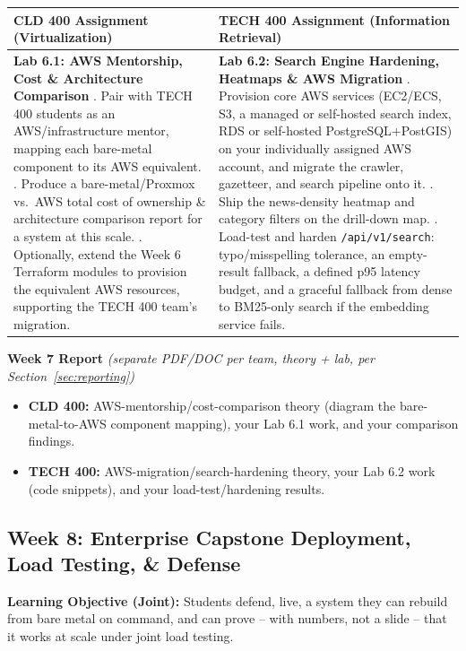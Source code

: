 \documentclass[10pt, a4paper]{article}
\newcommand{\weeklyreport}[3]{%
  \par\vspace{0.4em}
  \noindent\colorbox{lightgray!35}{\parbox{\dimexpr\textwidth-2\fboxsep\relax}{%
    \textbf{\color{primary}#1 Report} \textit{(separate PDF/DOC per team, theory + lab, per Section~\ref{sec:reporting})}
    \begin{itemize}
        \item \textbf{CLD 400:} #2
        \item \textbf{TECH 400:} #3
    \end{itemize}
  }}%
  \par\vspace{0.3em}
}
\begin{document}
\begin{table}[H]
\centering
\small
\renewcommand{\arraystretch}{1.2}
\begin{tabularx}{\textwidth}{|X|X|}
\hline
\rowcolor{lightgray}
\textbf{CLD 400 Assignment (Virtualization)} & \textbf{TECH 400 Assignment (Information Retrieval)} \\ \hline
\textbf{Lab 6.1: AWS Mentorship, Cost \& Architecture Comparison} \newline
1. Pair with TECH 400 students as an AWS/infrastructure mentor, mapping each bare-metal component to its AWS equivalent. \newline
2. Produce a bare-metal/Proxmox vs.\ AWS total cost of ownership \& architecture comparison report for a system at this scale. \newline
3. Optionally, extend the Week 6 Terraform modules to provision the equivalent AWS resources, supporting the TECH 400 team's migration. & \textbf{Lab 6.2: Search Engine Hardening, Heatmaps \& AWS Migration} \newline
1. Provision core AWS services (EC2/ECS, S3, a managed or self-hosted search index, RDS or self-hosted PostgreSQL+PostGIS) on your individually assigned AWS account, and migrate the crawler, gazetteer, and search pipeline onto it. \newline
2. Ship the news-density heatmap and category filters on the drill-down map. \newline
3. Load-test and harden \texttt{/api/v1/search}: typo/misspelling tolerance, an empty-result fallback, a defined p95 latency budget, and a graceful fallback from dense to BM25-only search if the embedding service fails. \\ \hline
\end{tabularx}
\end{table}

\weeklyreport{Week 7}{AWS-mentorship/cost-comparison theory (diagram the bare-metal-to-AWS component mapping), your Lab 6.1 work, and your comparison findings.}{AWS-migration/search-hardening theory, your Lab 6.2 work (code snippets), and your load-test/hardening results.}

\vspace{0.5em}

\subsection*{Week 8: Enterprise Capstone Deployment, Load Testing, \& Defense}
\textbf{Learning Objective (Joint):} Students defend, live, a system they can rebuild from bare metal on command, and can prove -- with numbers, not a slide -- that it works at scale under joint load testing.
\end{document}

